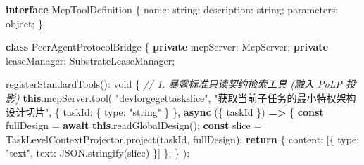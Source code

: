 \documentclass[
]{ctexart}
\newenvironment{Shaded}{}{}
\newcommand{\AttributeTok}[1]{\textcolor[rgb]{0.49,0.56,0.16}{#1}}
\newcommand{\BuiltInTok}[1]{\textcolor[rgb]{0.00,0.50,0.00}{#1}}
\newcommand{\CommentTok}[1]{\textcolor[rgb]{0.38,0.63,0.69}{\textit{#1}}}
\newcommand{\ControlFlowTok}[1]{\textcolor[rgb]{0.00,0.44,0.13}{\textbf{#1}}}
\newcommand{\DataTypeTok}[1]{\textcolor[rgb]{0.56,0.13,0.00}{#1}}
\newcommand{\FunctionTok}[1]{\textcolor[rgb]{0.02,0.16,0.49}{#1}}
\newcommand{\KeywordTok}[1]{\textcolor[rgb]{0.00,0.44,0.13}{\textbf{#1}}}
\newcommand{\NormalTok}[1]{#1}
\newcommand{\OperatorTok}[1]{\textcolor[rgb]{0.40,0.40,0.40}{#1}}
\newcommand{\StringTok}[1]{\textcolor[rgb]{0.25,0.44,0.63}{#1}}
\renewcommand{\_}{\discretionary{}{}{\textunderscore}}
\begin{document}
\begin{Shaded}
\begin{Highlighting}[]
\KeywordTok{interface}\NormalTok{ McpToolDefinition \{}
\NormalTok{  name}\OperatorTok{:} \DataTypeTok{string}\OperatorTok{;}
\NormalTok{  description}\OperatorTok{:} \DataTypeTok{string}\OperatorTok{;}
\NormalTok{  parameters}\OperatorTok{:} \DataTypeTok{object}\OperatorTok{;}
\NormalTok{\}}

\KeywordTok{class}\NormalTok{ PeerAgentProtocolBridge \{}
  \KeywordTok{private}\NormalTok{ mcpServer}\OperatorTok{:}\NormalTok{ McpServer}\OperatorTok{;}
  \KeywordTok{private}\NormalTok{ leaseManager}\OperatorTok{:}\NormalTok{ SubstrateLeaseManager}\OperatorTok{;}

  \FunctionTok{registerStandardTools}\NormalTok{()}\OperatorTok{:} \DataTypeTok{void}\NormalTok{ \{}
    \CommentTok{// 1. 暴露标准只读契约检索工具 (融入 PoLP 投影)}
    \KeywordTok{this}\OperatorTok{.}\AttributeTok{mcpServer}\OperatorTok{.}\FunctionTok{tool}\NormalTok{(}
      \StringTok{"devforge\_get\_task\_slice"}\OperatorTok{,}
      \StringTok{"获取当前子任务的最小特权架构设计切片"}\OperatorTok{,}
\NormalTok{      \{ taskId}\OperatorTok{:}\NormalTok{ \{ type}\OperatorTok{:} \StringTok{"string"}\NormalTok{ \} \}}\OperatorTok{,}
      \KeywordTok{async}\NormalTok{ (\{ taskId \}) }\KeywordTok{=\textgreater{}}\NormalTok{ \{}
        \KeywordTok{const}\NormalTok{ fullDesign }\OperatorTok{=} \ControlFlowTok{await} \KeywordTok{this}\OperatorTok{.}\FunctionTok{readGlobalDesign}\NormalTok{()}\OperatorTok{;}
        \KeywordTok{const}\NormalTok{ slice }\OperatorTok{=}\NormalTok{ TaskLevelContextProjector}\OperatorTok{.}\FunctionTok{project}\NormalTok{(taskId}\OperatorTok{,}\NormalTok{ fullDesign)}\OperatorTok{;}
        \ControlFlowTok{return}\NormalTok{ \{ content}\OperatorTok{:}\NormalTok{ [\{ type}\OperatorTok{:} \StringTok{"text"}\OperatorTok{,}\NormalTok{ text}\OperatorTok{:} \BuiltInTok{JSON}\OperatorTok{.}\FunctionTok{stringify}\NormalTok{(slice) \}] \}}\OperatorTok{;}
\NormalTok{      \}}
\NormalTok{    )}\OperatorTok{;}


\end{Highlighting}
\end{Shaded}
\end{document}
